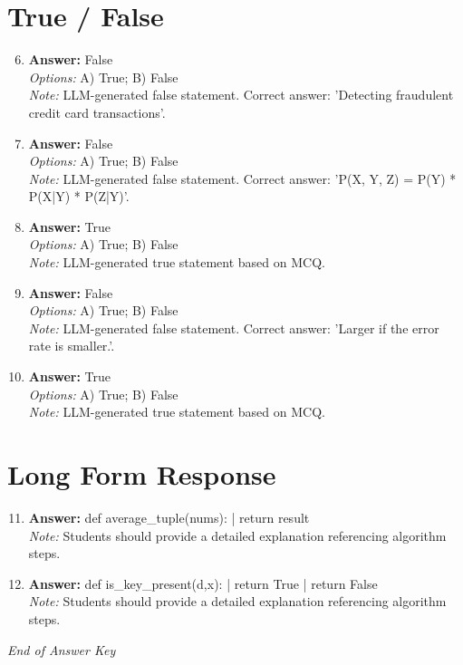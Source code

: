 \documentclass[12pt]{article}
\begin{document}
\section*{True / False}
\begin{enumerate}[label=\arabic*.]
\setcounter{enumi}{5}
\item \textbf{Answer:} False
\\ \textit{Options:} A) True; B) False
\\ \textit{Note:} LLM-generated false statement. Correct answer: 'Detecting fraudulent credit card transactions'.
\item \textbf{Answer:} False
\\ \textit{Options:} A) True; B) False
\\ \textit{Note:} LLM-generated false statement. Correct answer: 'P(X, Y, Z) = P(Y) * P(X|Y) * P(Z|Y)'.
\item \textbf{Answer:} True
\\ \textit{Options:} A) True; B) False
\\ \textit{Note:} LLM-generated true statement based on MCQ.
\item \textbf{Answer:} False
\\ \textit{Options:} A) True; B) False
\\ \textit{Note:} LLM-generated false statement. Correct answer: 'Larger if the error rate is smaller.'.
\item \textbf{Answer:} True
\\ \textit{Options:} A) True; B) False
\\ \textit{Note:} LLM-generated true statement based on MCQ.
\end{enumerate}

\section*{Long Form Response}
\begin{enumerate}[label=\arabic*.]
\setcounter{enumi}{10}
\item \textbf{Answer:} def average\_tuple(nums): | return result
\\ \textit{Note:} Students should provide a detailed explanation referencing algorithm steps.
\item \textbf{Answer:} def is\_key\_present(d,x): | return True | return False
\\ \textit{Note:} Students should provide a detailed explanation referencing algorithm steps.
\end{enumerate}

\vfill
\noindent\textit{End of Answer Key}
\end{document}
